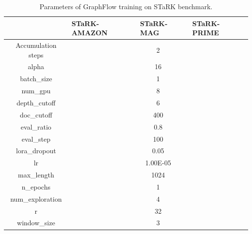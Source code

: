 \documentclass{article}
\begin{document}
\begin{table}[t]
  \centering
  \caption{Parameters of GraphFlow training on STaRK benchmark.}
    \begin{tabular}{c|ccc}
    \toprule
          & \multicolumn{1}{l|}{STaRK-AMAZON} & \multicolumn{1}{l|}{STaRK-MAG} & \multicolumn{1}{l}{STaRK-PRIME} \\
    \midrule
    \textcolor[rgb]{ 0,  .467,  .667}{Accumulation steps} & \multicolumn{3}{c}{\textcolor[rgb]{ .6,  0,  .333}{2}} \\
    \textcolor[rgb]{ 0,  .467,  .667}{alpha} & \multicolumn{3}{c}{\textcolor[rgb]{ .6,  0,  .333}{16}} \\
    \textcolor[rgb]{ 0,  .467,  .667}{batch\_size} & \multicolumn{3}{c}{\textcolor[rgb]{ .6,  0,  .333}{1}} \\
    \textcolor[rgb]{ 0,  .467,  .667}{num\_gpu} & \multicolumn{3}{c}{\textcolor[rgb]{ .6,  0,  .333}{8}} \\
    \textcolor[rgb]{ 0,  .467,  .667}{depth\_cutoff} & \multicolumn{3}{c}{\textcolor[rgb]{ .6,  0,  .333}{6}} \\
    \textcolor[rgb]{ 0,  .467,  .667}{doc\_cutoff} & \multicolumn{3}{c}{\textcolor[rgb]{ .6,  0,  .333}{400}} \\
    \textcolor[rgb]{ 0,  .467,  .667}{eval\_ratio} & \multicolumn{3}{c}{\textcolor[rgb]{ .6,  0,  .333}{0.8}} \\
    \textcolor[rgb]{ 0,  .467,  .667}{eval\_step} & \multicolumn{3}{c}{\textcolor[rgb]{ .6,  0,  .333}{100}} \\
    \textcolor[rgb]{ 0,  .467,  .667}{lora\_dropout} & \multicolumn{3}{c}{\textcolor[rgb]{ .6,  0,  .333}{0.05}} \\
    \textcolor[rgb]{ 0,  .467,  .667}{lr} & \multicolumn{3}{c}{\textcolor[rgb]{ .6,  0,  .333}{1.00E-05}} \\
    \textcolor[rgb]{ 0,  .467,  .667}{max\_length} & \multicolumn{3}{c}{\textcolor[rgb]{ .6,  0,  .333}{1024}} \\
    \textcolor[rgb]{ 0,  .467,  .667}{n\_epochs} & \multicolumn{3}{c}{\textcolor[rgb]{ .6,  0,  .333}{1}} \\
    \textcolor[rgb]{ 0,  .467,  .667}{num\_exploration} & \multicolumn{3}{c}{\textcolor[rgb]{ .6,  0,  .333}{4}} \\
    \textcolor[rgb]{ 0,  .467,  .667}{r} & \multicolumn{3}{c}{\textcolor[rgb]{ .6,  0,  .333}{32}} \\
    \textcolor[rgb]{ 0,  .467,  .667}{window\_size} & \multicolumn{3}{c}{\textcolor[rgb]{ .6,  0,  .333}{3}}\\
    \bottomrule
    \end{tabular}%
  \label{tab:params}%
\end{table}%
\end{document}

